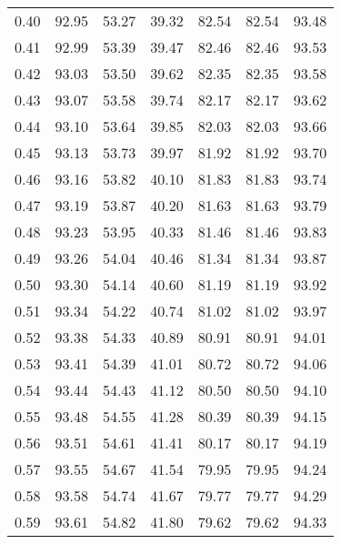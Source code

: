 \begin{tabular}{|c|c|c|c|c|c|c|}
      0.40 &     92.95 &     53.27 &      39.32 &   82.54 &      82.54 &         93.48 \\
      0.41 &     92.99 &     53.39 &      39.47 &   82.46 &      82.46 &         93.53 \\
      0.42 &     93.03 &     53.50 &      39.62 &   82.35 &      82.35 &         93.58 \\
      0.43 &     93.07 &     53.58 &      39.74 &   82.17 &      82.17 &         93.62 \\
      0.44 &     93.10 &     53.64 &      39.85 &   82.03 &      82.03 &         93.66 \\
      0.45 &     93.13 &     53.73 &      39.97 &   81.92 &      81.92 &         93.70 \\
      0.46 &     93.16 &     53.82 &      40.10 &   81.83 &      81.83 &         93.74 \\
      0.47 &     93.19 &     53.87 &      40.20 &   81.63 &      81.63 &         93.79 \\
      0.48 &     93.23 &     53.95 &      40.33 &   81.46 &      81.46 &         93.83 \\
      0.49 &     93.26 &     54.04 &      40.46 &   81.34 &      81.34 &         93.87 \\
      0.50 &     93.30 &     54.14 &      40.60 &   81.19 &      81.19 &         93.92 \\
      0.51 &     93.34 &     54.22 &      40.74 &   81.02 &      81.02 &         93.97 \\
      0.52 &     93.38 &     54.33 &      40.89 &   80.91 &      80.91 &         94.01 \\
      0.53 &     93.41 &     54.39 &      41.01 &   80.72 &      80.72 &         94.06 \\
      0.54 &     93.44 &     54.43 &      41.12 &   80.50 &      80.50 &         94.10 \\
      0.55 &     93.48 &     54.55 &      41.28 &   80.39 &      80.39 &         94.15 \\
      0.56 &     93.51 &     54.61 &      41.41 &   80.17 &      80.17 &         94.19 \\
      0.57 &     93.55 &     54.67 &      41.54 &   79.95 &      79.95 &         94.24 \\
      0.58 &     93.58 &     54.74 &      41.67 &   79.77 &      79.77 &         94.29 \\
      0.59 &     93.61 &     54.82 &      41.80 &   79.62 &      79.62 &         94.33 \\

\end{tabular}
